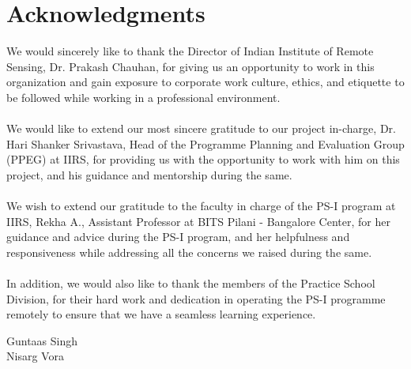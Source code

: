 \documentclass[12pt, a4paper]{report}
\begin{document}
\pagebreak

\setcounter{secnumdepth}{0}
\section{Acknowledgments}
\pagestyle{plain}
\setcounter{page}{3}
We would sincerely like to thank the Director of Indian Institute of Remote Sensing, Dr. Prakash Chauhan, for giving us an opportunity to work in this organization and gain exposure to corporate work culture, ethics, and etiquette to be followed while working in a professional environment.
\paragraph{}
We would like to extend our most sincere gratitude to our project in-charge, Dr. Hari Shanker Srivastava, Head of the Programme Planning and Evaluation Group (PPEG) at IIRS, for providing us with the opportunity to work with him on this project, and his guidance and mentorship during the same.
\paragraph{}
We wish to extend our gratitude to the faculty in charge of the PS-I program at IIRS, Rekha A., Assistant Professor at BITS Pilani - Bangalore Center, for her guidance and advice during the PS-I program, and her helpfulness and responsiveness while addressing all the concerns we raised during the same.
\paragraph{}
In addition, we would also like to thank the members of the Practice School Division, for their hard work and dedication in operating the PS-I programme remotely to ensure that we have a seamless learning experience.
\begin{flushright}
Guntaas Singh\\
Nisarg Vora
\end{flushright}
\pagebreak
\end{document}
